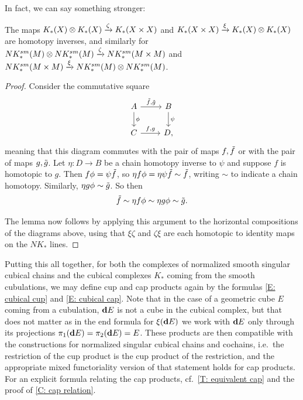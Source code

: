 In fact, we can say something stronger:

\begin{lemma}\label{L: EZ for cubical}
	The maps $K_*(X) \otimes K_*(X) \xrightarrow{\zeta}  K_*(X \times X)$ and $K_*(X \times X) \xrightarrow{\xi} K_*(X) \otimes K_*(X)$ are homotopy inverses, and similarly for $NK^{sm}_*(M) \otimes NK^{sm}_*(M) \xrightarrow{\zeta}  NK^{sm}_*(M \times M)$ and $NK^{sm}_*(M \times M) \xrightarrow{\xi} NK^{sm}_*(M) \otimes NK^{sm}_*(M) $.
\end{lemma}
\begin{proof}
	Consider the commutative square
	\[
	\begin{tikzcd}
	A \arrow[r,"\td f{,} \td g"]\arrow[d,"\phi"]& B\arrow[d,"\psi"]\\
	C \arrow[r,"f{,} g"]& D,
	\end{tikzcd}
	\]
	meaning that this diagram commutes with the pair of maps $f, \tilde f$ or with the pair of maps $g,\tilde g$.
	Let $\eta \colon D \to B$ be a chain homotopy inverse to $\psi$ and suppose $f$ is homotopic to $g$.
	Then $f \phi = \psi \tilde f$, so $\eta f \phi = \eta \psi \tilde f \sim \tilde f$, writing $\sim$ to indicate a chain homotopy.
	Similarly,  $\eta g \phi \sim \tilde g$.
	So then $$\tilde f \sim \eta f \phi  \sim \eta g \phi \sim \tilde g.$$

	The lemma now follows by applying this argument to the horizontal compositions of the diagrams above, using that $\xi \zeta$ and $\zeta \xi$ are each homotopic to identity maps on the $NK_*$ lines.
\end{proof}


Putting this all together, for both the complexes of normalized smooth singular cubical chains and the cubical complexes $K_*$ coming from the smooth cubulations, we may define cup and cap products again by the formulas \eqref{E: cubical cup} and \eqref{E: cubical cap}.
Note that in the case of a geometric cube $E$ coming from a cubulation, $\mathbf{d} E$ is not a cube in the cubical complex, but that does not matter as in the end formula for $\xi(\mathbf{d} E)$ we work with $\mathbf{d} E$ only through its projections $\pi_1(\mathbf{d} E) = \pi_2(\mathbf{d} E) = E$.
These products are then compatible with the constructions for normalized singular cubical chains and cochains, i.e.\ the restriction of the cup product is the cup product of the restriction, and the appropriate mixed functoriality version of that statement holds for cap products.
For an explicit formula relating the cap products, cf.\ \cref{T: equivalent cap} and the proof of \cref{C: cap relation}.

